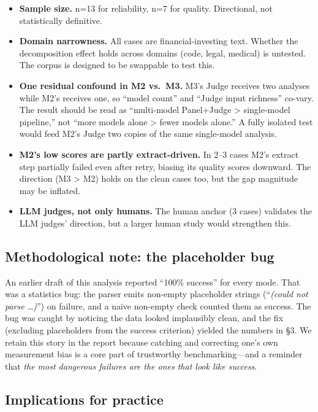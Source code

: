 \documentclass[11pt]{article}
\begin{document}
\begin{itemize}
  \item \textbf{Sample size.} n=13 for reliability, n=7 for quality. Directional,
        not statistically definitive.
  \item \textbf{Domain narrowness.} All cases are financial-investing text.
        Whether the decomposition effect holds across domains (code, legal,
        medical) is untested. The corpus is designed to be swappable to test
        this.
  \item \textbf{One residual confound in M2 vs.\ M3.} M3's Judge receives two
        analyses while M2's receives one, so ``model count'' and ``Judge input
        richness'' co-vary. The result should be read as ``multi-model
        Panel+Judge > single-model pipeline,'' not ``more models alone > fewer
        models alone.'' A fully isolated test would feed M2's Judge two copies
        of the same single-model analysis.
  \item \textbf{M2's low scores are partly extract-driven.} In 2--3 cases M2's
        extract step partially failed even after retry, biasing its quality
        scores downward. The direction (M3 > M2) holds on the clean cases too,
        but the gap magnitude may be inflated.
  \item \textbf{LLM judges, not only humans.} The human anchor (3 cases)
        validates the LLM judges' direction, but a larger human study would
        strengthen this.
\end{itemize}

\subsection{Methodological note: the placeholder bug}

An earlier draft of this analysis reported ``100\% success'' for every mode.
That was a statistics bug: the parser emits non-empty placeholder strings
(``\textit{(could not parse \ldots)}'') on failure, and a naive non-empty check
counted them as success. The bug was caught by noticing the data looked
implausibly clean, and the fix (excluding placeholders from the success
criterion) yielded the numbers in \S3. We retain this story in the report
because catching and correcting one's own measurement bias is a core part of
trustworthy benchmarking---and a reminder that \emph{the most dangerous failures
are the ones that look like success}.

\subsection{Implications for practice}
\end{document}
